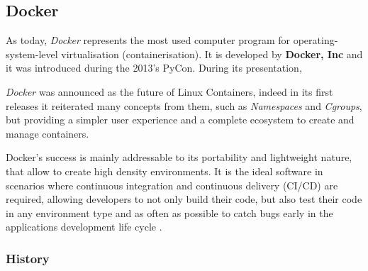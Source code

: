 \documentclass[a4paper,12pt]{article}
\begin{document}
\subsection{Docker}

As today, \textit{Docker} represents the most used computer program for
operating-system-level virtualisation (containerisation). It is developed by
\textbf{Docker, Inc}\cite{docker_official_site} and it was introduced during the
2013's PyCon. During its presentation, \par\textit{Docker} was announced as the
future of Linux Containers\cite{docker_pycon_presentation}, indeed in its first
releases it reiterated many concepts from them, such as \textit{Namespaces} and
\textit{Cgroups}, but providing a simpler user experience and a complete
ecosystem to create and manage containers.\par Docker's success is mainly
addressable to its portability and lightweight nature, that allow to create high
density environments. It is the ideal software in scenarios where continuous
integration and continuous delivery (CI/CD) are required, allowing developers to
not only build their code, but also test their code in any environment type and
as often as possible to catch bugs early in the applications development
life cycle \cite{docker_ci_cd}. 

\subsubsection{History}
\end{document}
